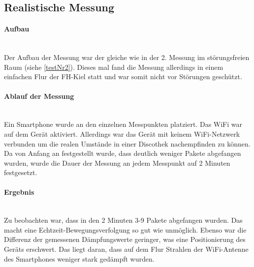 \documentclass[a4paper]{spie}  %
\begin{document}
\subsection{Realistische Messung}
\paragraph{Aufbau}\mbox{}\\
Der Aufbau der Messung war der gleiche wie in der 2. Messung im störungsfreien Raum (siehe \ref{testNr2}). Dieses mal fand die Messung allerdings in einem einfachen Flur der FH-Kiel statt und war somit nicht vor Störungen geschützt.

\paragraph{Ablauf der Messung}\mbox{}\\
Ein Smartphone wurde an den einzelnen Messpunkten platziert. Das WiFi war auf dem Gerät aktiviert. Allerdings war das Gerät mit keinem WiFi-Netzwerk verbunden um die realen Umstände in einer Discothek nachempfinden zu können. Da von Anfang an festgestellt wurde, dass deutlich weniger Pakete abgefangen wurden, wurde die Dauer der Messung an jedem Messpunkt auf 2 Minuten festgesetzt.

\paragraph{Ergebnis}\mbox{}\\
Zu beobachten war, dass in den 2 Minuten 3-9 Pakete abgefangen wurden. Das macht eine Echtzeit-Bewegungsverfolgung so gut wie unmöglich. Ebenso war die Differenz der gemessenen Dämpfungswerte geringer, was eine Positionierung des Geräts erschwert. Das liegt daran, dass auf dem Flur Strahlen der WiFi-Antenne des Smartphones weniger stark gedämpft wurden. 
\end{document}
